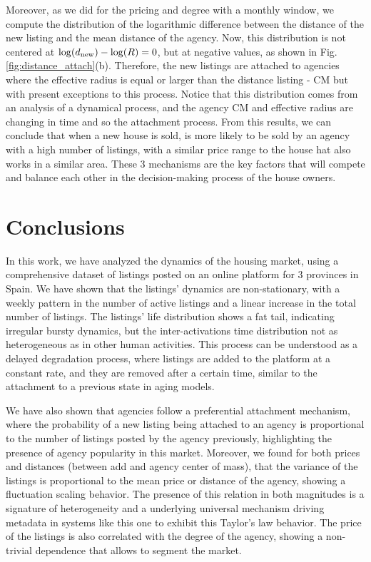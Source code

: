 Moreover, as we did for the pricing and degree with a monthly window, we compute the distribution of the logarithmic difference between the distance of the new listing and the mean distance of the agency. Now, this distribution is not centered at $\log(d_{\rm new}) - \log(R) = 0$, but at negative values, as shown in Fig. \ref{fig:distance_attach}(b). Therefore, the new listings are attached to agencies where the effective radius is equal or larger than the distance listing - CM but with present exceptions to this process. Notice that this distribution comes from an analysis of a dynamical process, and the agency CM and effective radius are changing in time and so the attachment process. From this results, we can conclude that when a new house is sold, is more likely to be sold by an agency with a high number of listings, with a similar price range to the house hat also works in a similar area. These 3 mechanisms are the key factors that will compete and balance each other in the decision-making process of the house owners.

\section{Conclusions}

In this work, we have analyzed the dynamics of the housing market, using a comprehensive dataset of listings posted on an online platform for 3 provinces in Spain. We have shown that the listings' dynamics are non-stationary, with a weekly pattern in the number of active listings and a linear increase in the total number of listings. The listings' life distribution shows a fat tail, indicating irregular bursty dynamics, but the inter-activations time distribution not as heterogeneous as in other human activities. This process can be understood as a delayed degradation process, where listings are added to the platform at a constant rate, and they are removed after a certain time, similar to the attachment to a previous state in aging models. 

We have also shown that agencies follow a preferential attachment mechanism, where the probability of a new listing being attached to an agency is proportional to the number of listings posted by the agency previously, highlighting the presence of agency popularity in this market. Moreover, we found for both prices and distances (between add and agency center of mass), that the variance of the listings is proportional to the mean price or distance of the agency, showing a fluctuation scaling behavior. The presence of this relation in both magnitudes is a signature of heterogeneity and a underlying universal mechanism driving metadata in systems like this one to exhibit this Taylor's law behavior. The price of the listings is also correlated with the degree of the agency, showing a non-trivial dependence that allows to segment the market. 

